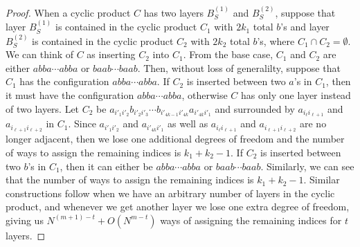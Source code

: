 \documentclass[11pt,reqno]{amsart}
\numberwithin{equation}{section}
\theoremstyle{plain}
\begin{document}
\begin{proof}
When a cyclic product $C$ has two layers $B^{(1)}_S$ and $B^{(2)}_S$, suppose that layer $B_S^{(1)}$ is contained in the cyclic product $C_1$ with $2k_1$ total $b$'s and layer $B_S^{(2)}$ is contained in the cyclic product $C_2$ with $2k_2$ total $b$'s, where $C_1\cap C_2=\emptyset$. We can think of $C$ as inserting $C_2$ into $C_1$. From the base case, $C_1$ and $C_2$ are either $abba\cdots abba$ or $baab\cdots baab$. Then, without loss of generalilty, suppose that $C_1$ has the configuration $abba\cdots abba$. If $C_2$ is inserted between two $a$'s in $C_1$, then it must have the configuration $abba\cdots abba$, otherwise $C$ has only one layer instead of two layers. Let $C_2$ be $a_{i'_{1}i'_{2}}b_{i'_{2}i'_{3}}\cdots b_{i'_{4k-1}i'_{4k}}a_{i'_{4k}i'_{1}}$ and surrounded by $a_{i_\ell i_{\ell+1}}$ and $a_{i_{\ell+1}i_{\ell+2}}$ in $C_1$. Since $a_{i'_{1}i'_{2}}$ and $a_{i'_{4k}i'_{1}}$ as well as $a_{i_\ell i_{\ell+1}}$ and $a_{i_{\ell+1}i_{\ell+2}}$ are no longer adjacent, then we lose one additional degrees of freedom and the number of ways to assign the remaining indices is $k_1+k_2-1$. If $C_2$ is inserted between two $b$'s in $C_1$, then it can either be $abba\cdots abba$ or $baab\cdots baab$. Similarly, we can see that the number of ways to assign the remaining indices is $k_1+k_2-1$. Similar constructions follow when we have an arbitrary number of layers in the cyclic product, and whenever we get another layer we lose one extra degree of freedom, giving us $N^{(m+1)-t}+O(N^{m-t})$ ways of assigning the remaining indices for $t$ layers.


\end{proof}
\end{document}
